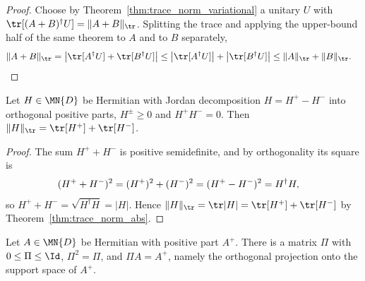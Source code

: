 \begin{proof}\leanok
    Choose by Theorem~\ref{thm:trace_norm_variational} a unitary $U$ with
    $\tr[(A+B)^\dagger U]=\lVert A+B\rVert_{\tr}$.
    Splitting the trace and applying the upper-bound half of the same
    theorem to $A$ and to $B$ separately,
    \begin{align}
        \lVert A+B\rVert_{\tr}
        &=\bigl|\tr[A^\dagger U]
              +\tr[B^\dagger U]\bigr|
          \leq\bigl|\tr[A^\dagger U]\bigr|
          +\bigl|\tr[B^\dagger U]\bigr|
          \leq\lVert A\rVert_{\tr}+\lVert B\rVert_{\tr}.
        \notag
    \end{align}
\end{proof}

\begin{lemma}
    \label{lem:trace_norm_jordan}
    \leanok
    Let $H\in\MN{D}$ be Hermitian with Jordan decomposition $H=H^+-H^-$
    into orthogonal positive parts, $H^\pm\geq0$ and $H^+H^-=0$. Then
    $\lVert H\rVert_{\tr}=\tr[H^+]+\tr[H^-]$.
\end{lemma}

\begin{proof}\leanok
    The sum $H^++H^-$ is positive semidefinite, and by orthogonality its
    square is
    \begin{align}
        (H^++H^-)^2
        &=(H^+)^2+(H^-)^2
          =(H^+-H^-)^2
          =H^\dagger H,
        \notag
    \end{align}
    so $H^++H^-=\sqrt{H^\dagger H}=\lvert H\rvert$. Hence
    $\lVert H\rVert_{\tr}
    =\tr\lvert H\rvert
    =\tr[H^+]+\tr[H^-]$
    by Theorem~\ref{thm:trace_norm_abs}.
\end{proof}

\begin{lemma}
    \label{lem:positive_part_support_projection}
    \leanok
    Let $A\in\MN{D}$ be Hermitian with positive part $A^+$. There is a
    matrix $\Pi$ with $0\leq\Pi\leq\Id$, $\Pi^2=\Pi$, and $\Pi A=A^+$, namely
    the orthogonal projection onto the support space of $A^+$.
\end{lemma}


